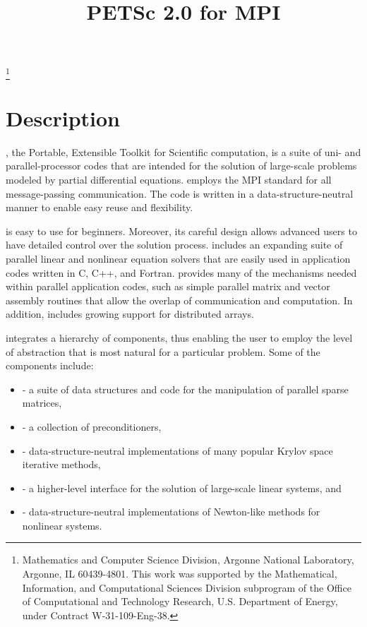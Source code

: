 \pagestyle{empty}

\pagestyle{empty}
\title{PETSc 2.0 for MPI}
\thanks{Mathematics and Computer Science Division,
Argonne National Laboratory,
Argonne, IL 60439-4801.
This work was supported by the Mathematical,
        Information, and Computational Sciences Division subprogram of
        the Office of Computational and Technology Research,
        U.S. Department of Energy, under Contract W-31-109-Eng-38.}

\date{}
\maketitle

\section*{Description}

, the Portable, Extensible Toolkit for Scientific computation,
is a suite of uni- and parallel-processor codes that are intended for
the solution of large-scale problems modeled by partial differential
equations.   employs the MPI standard for all
message-passing communication.  The code is written in a
data-structure-neutral manner to enable easy reuse and flexibility.

 is easy to use for beginners.  Moreover, its careful
design allows advanced users to have detailed control over the
solution process.  includes an expanding suite of parallel
linear and nonlinear equation solvers that are easily used in
application codes written in C, C++, and Fortran.  
provides many of the mechanisms needed within parallel application
codes, such as simple parallel matrix and vector assembly routines
that allow the overlap of communication and computation.  In addition,
 includes growing support for distributed arrays.

 integrates a hierarchy of components, thus
enabling the user to employ the level of abstraction that is most
natural for a particular problem.  Some of the components include:
\vspace{-.4cm}
\begin{itemize}
\item {} - a suite of data structures and code
      for the manipulation of parallel sparse matrices,
\item {} - a collection of preconditioners,
\item {} - data-structure-neutral implementations of
      many popular Krylov space iterative methods,
\item {} - a higher-level interface for the solution of
      large-scale linear systems, and
\item {} - data-structure-neutral implementations of Newton-like
      methods for nonlinear systems.
\end{itemize}

